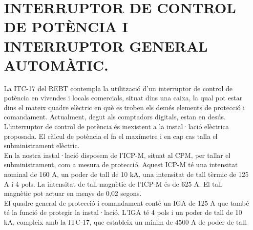 \chapter{\uppercase{Interruptor de control de potència i interruptor general automàtic.}}
La ITC-17 del REBT contempla la utilització d'un interruptor de control de potència en vivendes i locals comercials, situat dins una caixa, la qual pot estar dins el mateix quadre elèctric en què es troben els demés elements de protecció i comandament. Actualment, degut als comptadors digitals, estan en desús.\\
\newline L'interruptor de control de potència és inexistent a la instal·lació elèctrica proposada. El càlcul de potència el fa el maxímetre i en cap cas talla el subministrament elèctric.\\
\newline En la nostra instal·lació disposem de l'ICP-M, situat al CPM, per tallar el subministrament, com a mesura de protecció. Aquest ICP-M té una intensitat nominal de 160 A, un poder de tall de 10 kA, una intensitat de tall tèrmic de 125 A i 4 pols. La intensitat de tall magnètic de l'ICP-M és de 625 A. El tall magnètic pot actuar en menys de 0,02 segons.\\
\newline El quadre general de protecció i comandament conté un IGA de 125 A que també té la funció de protegir la instal·lació. L'IGA té 4 pols i un poder de tall de 10 kA, compleix amb la ITC-17, que estableix un mínim de 4500 A de poder de tall.

\clearpage